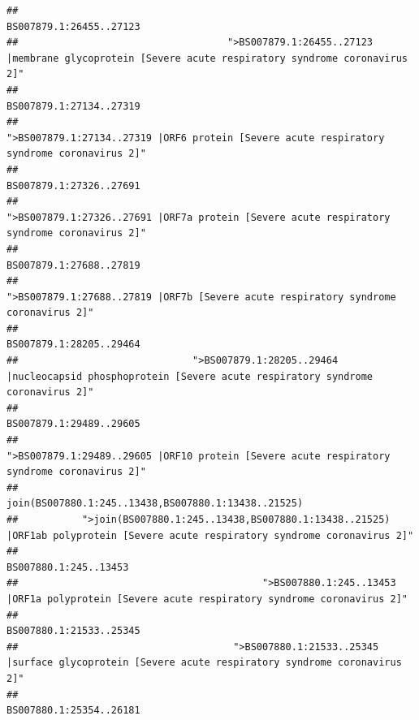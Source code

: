 \documentclass[
]{article}
\begin{document}
\begin{verbatim}
##                                                                                                                BS007879.1:26455..27123 
##                                    ">BS007879.1:26455..27123 |membrane glycoprotein [Severe acute respiratory syndrome coronavirus 2]" 
##                                                                                                                BS007879.1:27134..27319 
##                                             ">BS007879.1:27134..27319 |ORF6 protein [Severe acute respiratory syndrome coronavirus 2]" 
##                                                                                                                BS007879.1:27326..27691 
##                                            ">BS007879.1:27326..27691 |ORF7a protein [Severe acute respiratory syndrome coronavirus 2]" 
##                                                                                                                BS007879.1:27688..27819 
##                                                    ">BS007879.1:27688..27819 |ORF7b [Severe acute respiratory syndrome coronavirus 2]" 
##                                                                                                                BS007879.1:28205..29464 
##                              ">BS007879.1:28205..29464 |nucleocapsid phosphoprotein [Severe acute respiratory syndrome coronavirus 2]" 
##                                                                                                                BS007879.1:29489..29605 
##                                            ">BS007879.1:29489..29605 |ORF10 protein [Severe acute respiratory syndrome coronavirus 2]" 
##                                                                                    join(BS007880.1:245..13438,BS007880.1:13438..21525) 
##           ">join(BS007880.1:245..13438,BS007880.1:13438..21525) |ORF1ab polyprotein [Severe acute respiratory syndrome coronavirus 2]" 
##                                                                                                                  BS007880.1:245..13453 
##                                          ">BS007880.1:245..13453 |ORF1a polyprotein [Severe acute respiratory syndrome coronavirus 2]" 
##                                                                                                                BS007880.1:21533..25345 
##                                     ">BS007880.1:21533..25345 |surface glycoprotein [Severe acute respiratory syndrome coronavirus 2]" 
##                                                                                                                BS007880.1:25354..26181 

\end{verbatim}
\end{document}
